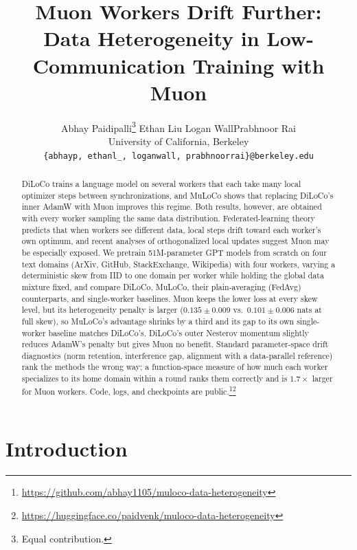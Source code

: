 \documentclass{article}
\title{Muon Workers Drift Further:\\ Data Heterogeneity in Low-Communication Training with Muon}
\author{
  Abhay Paidipalli\thanks{Equal contribution.} \quad Ethan Liu\footnotemark[1] \quad
  Logan Wall\footnotemark[1] \quad Prabhnoor Rai\footnotemark[1] \\[2pt]
  University of California, Berkeley \\
  \texttt{\{abhayp, ethanl\_, loganwall, prabhnoorrai\}@berkeley.edu}
}
\date{}
\begin{document}
\maketitle

\begin{abstract}
DiLoCo trains a language model on several workers that each take many local optimizer steps between synchronizations, and MuLoCo shows that replacing DiLoCo's inner AdamW with Muon improves this regime. Both results, however, are obtained with every worker sampling the same data distribution. Federated-learning theory predicts that when workers see different data, local steps drift toward each worker's own optimum, and recent analyses of orthogonalized local updates suggest Muon may be especially exposed. We pretrain 51M-parameter GPT models from scratch on four text domains (ArXiv, GitHub, StackExchange, Wikipedia) with four workers, varying a deterministic skew from IID to one domain per worker while holding the global data mixture fixed, and compare DiLoCo, MuLoCo, their plain-averaging (FedAvg) counterparts, and single-worker baselines. Muon keeps the lower loss at every skew level, but its heterogeneity penalty is larger ($0.135 \pm 0.009$ vs.\ $0.101 \pm 0.006$ nats at full skew), so MuLoCo's advantage shrinks by a third and its gap to its own single-worker baseline matches DiLoCo's. DiLoCo's outer Nesterov momentum slightly reduces AdamW's penalty but gives Muon no benefit. Standard parameter-space drift diagnostics (norm retention, interference gap, alignment with a data-parallel reference) rank the methods the wrong way; a function-space measure of how much each worker specializes to its home domain within a round ranks them correctly and is $1.7\times$ larger for Muon workers. Code, logs, and checkpoints are public.\footnote{\url{https://github.com/abhay1105/muloco-data-heterogeneity}}\footnote{\url{https://huggingface.co/paidvenk/muloco-data-heterogeneity}}
\end{abstract}

\section{Introduction}
\end{document}
